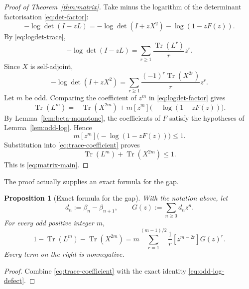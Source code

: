 \documentclass[11pt]{article}
\newtheorem{proposition}[theorem]{Proposition}
\newcommand{\Tr}{\operatorname{Tr}}
\begin{document}
\begin{proof}[Proof of Theorem~\ref{thm:matrix}]
Take minus the logarithm of the determinant factorisation
\eqref{eq:det-factor}:
\begin{equation}
  -\log\det(I-zL)
  =
  -\log\det(I+zX^2)
  -\log(1-zF(z)).
  \label{eq:logdet-factor}
\end{equation}
By \eqref{eq:logdet-trace},
\[
  -\log\det(I-zL)
  =\sum_{r\ge1}\frac{\Tr(L^r)}{r}z^r.
\]
Since $X$ is self-adjoint,
\begin{equation}
  -\log\det(I+zX^2)
  =
  \sum_{r\ge1}\frac{(-1)^r\Tr(X^{2r})}{r}z^r.
  \label{eq:X-even-log}
\end{equation}
Let $m$ be odd.  Comparing the coefficient of $z^m$ in
\eqref{eq:logdet-factor} gives
\begin{equation}
  \Tr(L^m)
  =
  -\Tr(X^{2m})
  +m[z^m]\bigl(-\log(1-zF(z))\bigr).
  \label{eq:trace-coefficient}
\end{equation}
By Lemma~\ref{lem:beta-monotone}, the coefficients of $F$ satisfy the
hypotheses of Lemma~\ref{lem:odd-log}.  Hence
\[
  m[z^m]\bigl(-\log(1-zF(z))\bigr)\le1.
\]
Substitution into \eqref{eq:trace-coefficient} proves
\[
  \Tr(L^m)+\Tr(X^{2m})\le1.
\]
This is \eqref{eq:matrix-main}.
\end{proof}

The proof actually supplies an exact formula for the gap.

\begin{proposition}[Exact formula for the gap]
\label{prop:matrix-defect}
With the notation above, let
\[
  d_n:=\beta_n-\beta_{n+1},
  \qquad
  G(z):=\sum_{n\ge0}d_nz^n.
\]
For every odd positive integer $m$,
\begin{equation}
  1-\Tr(L^m)-\Tr(X^{2m})
  =
  m\sum_{r=1}^{(m-1)/2}\frac1r
  [z^{m-2r}]G(z)^r.
  \label{eq:matrix-defect}
\end{equation}
Every term on the right is nonnegative.
\end{proposition}

\begin{proof}
Combine \eqref{eq:trace-coefficient} with the exact identity
\eqref{eq:odd-log-defect}.
\end{proof}
\end{document}
